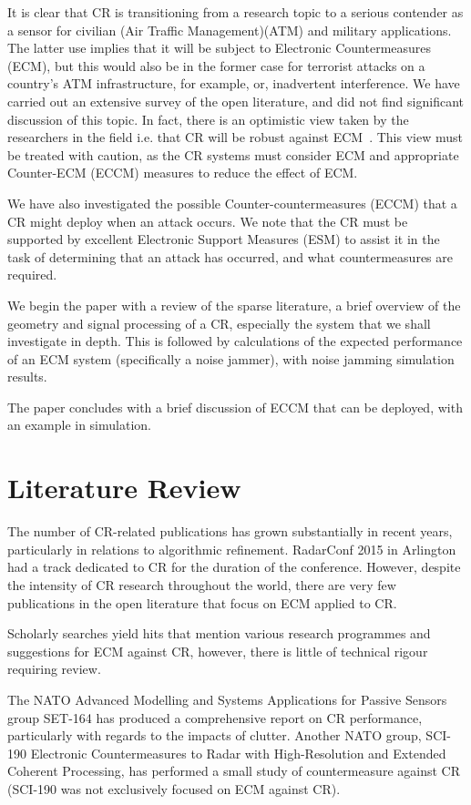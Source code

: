 \documentclass[conference]{IEEEtran}
\begin{document}
It is clear that CR is transitioning from a research topic to a serious contender as a sensor for civilian (Air Traffic Management)(ATM) and military applications. The latter use implies that it will be subject to Electronic Countermeasures (ECM), but this would also be in the former case for terrorist attacks on a country's ATM infrastructure, for example, or, inadvertent interference. We have carried out an extensive survey of the open literature, and did not find significant discussion of this topic. In fact, there is an optimistic view taken by the researchers in the field i.e. that CR will be robust against ECM~\cite{villano:13}. This view must be treated with caution, as the CR systems must consider ECM and appropriate Counter-ECM (ECCM) measures to reduce the effect of ECM.

We have also investigated the possible Counter-countermeasures (ECCM) that a CR might deploy when an attack occurs. We note that the CR must be supported by excellent Electronic Support Measures (ESM) to assist it in the task of determining that an attack has occurred, and what countermeasures are required.

We begin the paper with a review of the sparse literature,  a brief overview of the geometry and signal processing of a CR, especially the system that we shall investigate in depth. This is followed by calculations of the expected performance of an ECM system (specifically a noise jammer), with noise jamming simulation results.

The paper concludes with a brief discussion of ECCM that can be deployed, with an example in simulation.


\section{Literature Review}
The number of CR-related publications has grown substantially in recent years,
particularly in relations to algorithmic refinement. RadarConf 2015 in Arlington had
a track dedicated to CR for the duration of the conference. However, despite
the intensity of CR research throughout the world, there are very few publications
in the open literature that focus on ECM applied to CR.

Scholarly searches yield hits that mention various research
programmes and suggestions for ECM against CR, however, there is little
of technical rigour requiring review.

The NATO Advanced Modelling and Systems Applications for Passive Sensors group SET-164 has produced a comprehensive report on CR performance, particularly with regards to the impacts of clutter. Another NATO group, SCI-190 Electronic Countermeasures to Radar with High-Resolution and Extended Coherent Processing, has performed a small study of countermeasure against CR (SCI-190 was not exclusively focused on ECM against CR).
\end{document}
